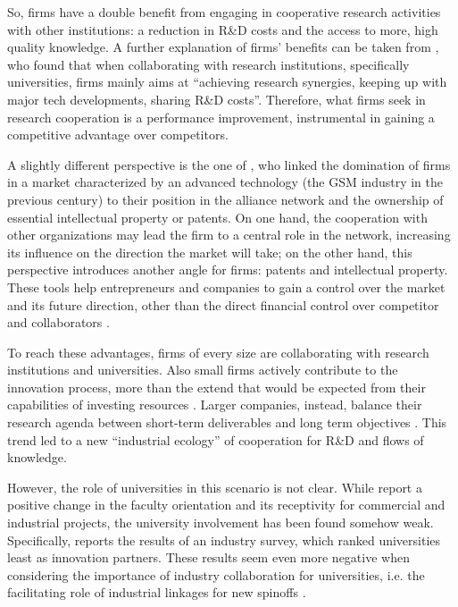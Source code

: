 So, firms have a double benefit from engaging in cooperative research activities with other institutions: a reduction in R\&D costs and the access to more, high quality knowledge. A further explanation of firms' benefits can be taken from \citet{Caloghirou2001}, who found that when collaborating with research institutions, specifically universities, firms mainly aims at \enquote{achieving research synergies, keeping up with major tech developments, sharing R\&D costs}. Therefore, what firms seek in research cooperation is a performance improvement, instrumental in gaining a competitive advantage over competitors. 

A slightly different perspective is the one of \citet{Bekkers2002}, who linked the domination of firms in a market characterized by an advanced technology (the GSM industry in the previous century) to their position in the alliance network and the ownership of essential intellectual property or patents. On one hand, the cooperation with other organizations may lead the firm to a central role in the network, increasing its influence on the direction the market will take; on the other hand, this perspective introduces another angle for firms: patents and intellectual property. These tools help entrepreneurs and companies to gain a control over the market and its future direction, other than the direct financial control over competitor and collaborators \citep{Siegel2003a}. 

To reach these advantages, firms of every size are collaborating with research institutions and universities. Also small firms actively contribute to the innovation process, more than the extend that would be expected from their capabilities of investing resources \citep{Audretsch2005}. Larger companies, instead, balance their research agenda between short-term deliverables and long term objectives \citep{Tijssen2006}. This trend led to a new \enquote{industrial ecology} of cooperation for R\&D and flows of knowledge.

However, the role of universities in this scenario is not clear. While \citet{Thursby2002} report a positive change in the faculty orientation and its receptivity for commercial and industrial projects, the university involvement has been found somehow weak. Specifically,\citet{Yusuf2008} reports the results of an industry survey, which ranked universities least as innovation partners. These results seem even more negative when considering the importance of industry collaboration for universities, i.e. the facilitating role of industrial linkages for new spinoffs \citep{OShea2005}.

